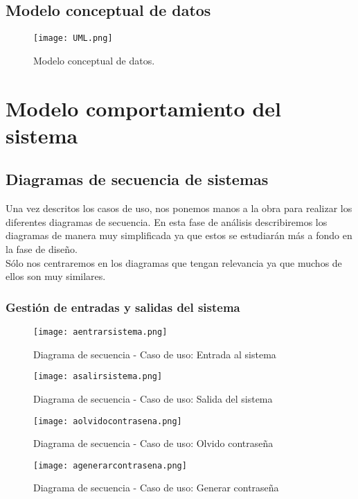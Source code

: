 \clearpage

\subsection{Modelo conceptual de datos}
\begin{figure}[H]
  \centering
    \texttt{[image: UML.png]}
  \caption{Modelo conceptual de datos.}
  \label{uml}
\end{figure}

\section{Modelo comportamiento del sistema}

\subsection{Diagramas de secuencia de sistemas}

Una vez descritos los casos de uso, nos ponemos manos a la obra para realizar los diferentes diagramas de secuencia. En esta fase de análisis describiremos los diagramas de manera muy simplificada ya que estos se estudiarán más a fondo en la fase de diseño.\\
Sólo nos centraremos en los diagramas que tengan relevancia ya que muchos de ellos son muy similares.

\subsubsection{Gestión de entradas y salidas del sistema}
\begin{figure}[!htb]
  \centering
    \texttt{[image: aentrarsistema.png]}
  \caption{Diagrama de secuencia - Caso de uso: Entrada al sistema }
  \label{a}
\end{figure}

\begin{figure}[!htb]
  \centering
    \texttt{[image: asalirsistema.png]}
  \caption{Diagrama de secuencia - Caso de uso: Salida del sistema }
  \label{a}
\end{figure}

\begin{figure}[!htb]
  \centering
    \texttt{[image: aolvidocontrasena.png]}
  \caption{Diagrama de secuencia - Caso de uso: Olvido contraseña  }
  \label{a}
\end{figure}

\begin{figure}[!htb]
  \centering
    \texttt{[image: agenerarcontrasena.png]}
  \caption{Diagrama de secuencia - Caso de uso: Generar contraseña  }
  \label{a}
\end{figure}

